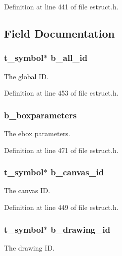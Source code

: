 Definition at line 441 of file estruct.\-h.



\subsection{Field Documentation}
\hypertarget{struct__ebox_a0f63dcf604135dd4fbfbf43eaed53c1a}{
\subsubsection[{b\-\_\-all\-\_\-id}]{\setlength{\rightskip}{0pt plus 5cm}t\-\_\-symbol$\ast$ b\-\_\-all\-\_\-id}}\label{struct__ebox_a0f63dcf604135dd4fbfbf43eaed53c1a}
The global I\-D. 

Definition at line 453 of file estruct.\-h.

\hypertarget{struct__ebox_a01fa53a36dc717c81755d805a868ad9d}{
\subsubsection[{b\-\_\-boxparameters}]{ b\-\_\-boxparameters}}\label{struct__ebox_a01fa53a36dc717c81755d805a868ad9d}
The ebox parameters. 

Definition at line 471 of file estruct.\-h.

\hypertarget{struct__ebox_ac0251c6969a1032f8f50d076e909fb3e}{
\subsubsection[{b\-\_\-canvas\-\_\-id}]{\setlength{\rightskip}{0pt plus 5cm}t\-\_\-symbol$\ast$ b\-\_\-canvas\-\_\-id}}\label{struct__ebox_ac0251c6969a1032f8f50d076e909fb3e}
The canvas I\-D. 

Definition at line 449 of file estruct.\-h.

\hypertarget{struct__ebox_a153f9c9929d722ecb29217f3fb0914c9}{
\subsubsection[{b\-\_\-drawing\-\_\-id}]{\setlength{\rightskip}{0pt plus 5cm}t\-\_\-symbol$\ast$ b\-\_\-drawing\-\_\-id}}\label{struct__ebox_a153f9c9929d722ecb29217f3fb0914c9}
The drawing I\-D. 

